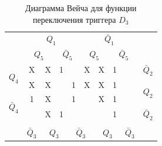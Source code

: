 \documentclass[a4paper,14pt]{article}
\begin{document}
\begin{table}[H]
	\begin{center}
		\caption{\label{tab:D3_tab} Диаграмма Вейча для функции переключения триггера $D_3$ }
		\begin{tabular}{cccccccccc}
			& \multicolumn{4}{c}{$Q_1$} & \multicolumn{4}{c}{$\bar{Q}_1$} &  \\
			& \multicolumn{2}{c}{$Q_5$} & \multicolumn{2}{c}{$\bar{Q}_5$} & \multicolumn{2}{c}{$Q_5$} & \multicolumn{2}{c}{$\bar{Q}_5$} &  \\ \cline{2-9}
			\multicolumn{1}{c|}{\multirow{2}{*}{$Q_4$}} & \multicolumn{1}{c|}{X} & \multicolumn{1}{c|}{X} & \multicolumn{1}{c|}{1} & \multicolumn{1}{c|}{} & \multicolumn{1}{c|}{X} & \multicolumn{1}{c|}{X} & \multicolumn{1}{c|}{1} & \multicolumn{1}{c|}{} & $\bar{Q}_2$ \\ \cline{2-9}
			\multicolumn{1}{c|}{} & \multicolumn{1}{c|}{X} & \multicolumn{1}{c|}{X} & \multicolumn{1}{c|}{} & \multicolumn{1}{c|}{1} & \multicolumn{1}{c|}{X} & \multicolumn{1}{c|}{X} & \multicolumn{1}{c|}{1} & \multicolumn{1}{c|}{} & \multirow{2}{*}{$Q_2$} \\ \cline{2-9}
			\multicolumn{1}{c|}{\multirow{2}{*}{$\bar{Q}_4$}} & \multicolumn{1}{c|}{1} & \multicolumn{1}{c|}{X} & \multicolumn{1}{c|}{} & \multicolumn{1}{c|}{1} & \multicolumn{1}{c|}{} & \multicolumn{1}{c|}{X} & \multicolumn{1}{c|}{1} & \multicolumn{1}{c|}{} &  \\ \cline{2-9}
			\multicolumn{1}{c|}{} & \multicolumn{1}{c|}{} & \multicolumn{1}{c|}{X} & \multicolumn{1}{c|}{1} & \multicolumn{1}{c|}{} & \multicolumn{1}{c|}{} & \multicolumn{1}{c|}{} & \multicolumn{1}{c|}{1} & \multicolumn{1}{c|}{} & $\bar{Q}_2$ \\ \cline{2-9}
			&  & \multicolumn{2}{c}{} & \multicolumn{2}{c}{} & \multicolumn{2}{c}{} &  &  \\
			& $\bar{Q}_3$ & \multicolumn{2}{c}{$Q_3$} & \multicolumn{2}{c}{$\bar{Q}_3$} & \multicolumn{2}{c}{$Q_3$} & $\bar{Q}_3$ & 
		\end{tabular}
	\end{center}
\end{table}

\end{document}
